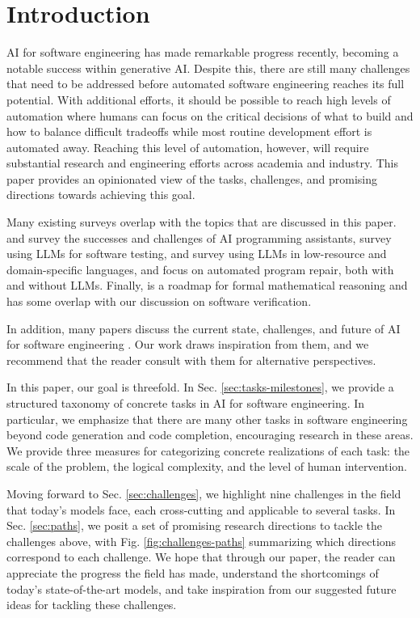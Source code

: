 \section{Introduction}

AI for software engineering has made remarkable progress recently, becoming a notable success within generative AI.
Despite this, there are still many challenges that need to be addressed before automated software engineering reaches its full potential. With additional efforts, it should be possible to reach high levels of automation where humans can focus on the critical decisions of what to build and how to balance difficult tradeoffs while most routine development effort is automated away. Reaching this level of automation, however, will require substantial research and engineering efforts across academia and industry. This paper provides an opinionated view of the tasks, challenges, and promising directions towards achieving this goal.
%

Many existing surveys overlap with the topics that are discussed in this paper. \citet{liang2024large} and \citet{sergeyuk2025using} survey the successes and challenges of AI programming assistants, \citep{wang2024software} survey using LLMs for software testing, and \citet{joel2024survey} survey using LLMs in low-resource and domain-specific languages, and \citet{zhang2023survey} focus on automated program repair, both with and without LLMs. Finally, \citet{yang2024formal} is a roadmap for formal mathematical reasoning and has some overlap with our discussion on software verification.

In addition, many papers discuss the current state, challenges, and future of AI for software engineering \citep{fan2023large, ozkaya2023application, wong2023natural, zheng2023survey, hou2024large, jin2024llms, wan2024deep, roychoudhury2025ai}. Our work draws inspiration from them, and we recommend that the reader consult with them for alternative perspectives. 

In this paper, our goal is threefold. In Sec. \ref{sec:tasks-milestones}, we provide a structured taxonomy of concrete tasks in AI for software engineering. In particular, we emphasize that there are many other tasks in software engineering beyond code generation and code completion, encouraging research in these areas. We provide three measures for categorizing concrete realizations of each task: the scale of the problem, the logical complexity, and the level of human intervention. 

Moving forward to Sec. \ref{sec:challenges}, we highlight nine challenges in the field that today's models face, each cross-cutting and applicable to several tasks. In Sec. \ref{sec:paths}, we posit a set of promising research directions to tackle the challenges above, with Fig. \ref{fig:challenges-paths} summarizing which directions correspond to each challenge. We hope that through our paper, the reader can appreciate the progress the field has made, understand the shortcomings of today's state-of-the-art models, and take inspiration from our suggested future ideas for tackling these challenges.


